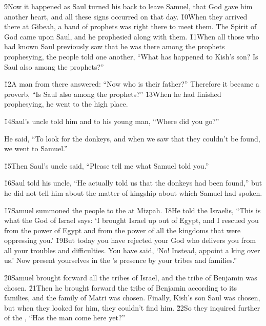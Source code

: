 \v{9}Now it happened as Saul turned his back to leave Samuel, that God gave him another heart, and all these signs occurred on that day. \v{10}When they arrived there at Gibeah, a band of prophets was right there to meet them. The Spirit of God came upon Saul, and he prophesied along with them. \v{11}When all those who had known Saul previously saw that he was there among the prophets prophesying, the people told one another, ``What has happened to Kish's son? Is Saul also among the prophets?''

\v{12}A man from there answered: ``Now who is their father?'' Therefore it became a proverb, ``Is Saul also among the prophets?'' \v{13}When he had finished prophesying, he went to the high place.

\v{14}Saul's uncle told him and to his young man, ``Where did you go?''

He said, ``To look for the donkeys, and when we saw that they couldn't be found, we went to Samuel.''

\v{15}Then Saul's uncle said, ``Please tell me what Samuel told you.''

\v{16}Saul told his uncle, ``He actually told us that the donkeys had been found,'' but he did not tell him about the matter of kingship about which Samuel had spoken.

\v{17}Samuel summoned the people to the  at Mizpah. \v{18}He told the Israelis, ``This is what the  God of Israel says: `I brought Israel up out of Egypt, and I rescued you from the power of Egypt and from the power of all the kingdoms that were oppressing you.' \v{19}But today you have rejected your God who delivers you from all your troubles and difficulties. You have said, `No! Instead, appoint a king over us.' Now present yourselves in the 's presence by your tribes and families.''

\v{20}Samuel brought forward all the tribes of Israel, and the tribe of Benjamin was chosen. \v{21}Then he brought forward the tribe of Benjamin according to its families, and the family of Matri was chosen. Finally, Kish's son Saul was chosen, but when they looked for him, they couldn't find him. \v{22}So they inquired further of the , ``Has the man come here yet?''

